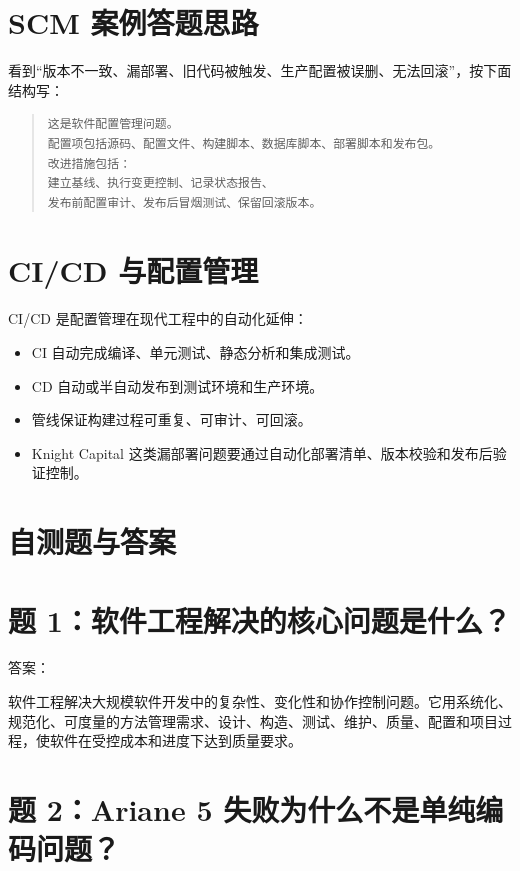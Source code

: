 \documentclass[UTF8,zihao=-4]{ctexart}
\begin{document}
\section{SCM 案例答题思路}

看到“版本不一致、漏部署、旧代码被触发、生产配置被误删、无法回滚”，按下面结构写：

\begin{quote}
\footnotesize
\begin{verbatim}
这是软件配置管理问题。
配置项包括源码、配置文件、构建脚本、数据库脚本、部署脚本和发布包。
改进措施包括：
建立基线、执行变更控制、记录状态报告、
发布前配置审计、发布后冒烟测试、保留回滚版本。
\end{verbatim}
\end{quote}

\section{CI/CD 与配置管理}

CI/CD 是配置管理在现代工程中的自动化延伸：

\begin{itemize}
\item CI 自动完成编译、单元测试、静态分析和集成测试。
\item CD 自动或半自动发布到测试环境和生产环境。
\item 管线保证构建过程可重复、可审计、可回滚。
\item Knight Capital 这类漏部署问题要通过自动化部署清单、版本校验和发布后验证控制。
\end{itemize}

\section{自测题与答案}

\section{题 1：软件工程解决的核心问题是什么？}

答案：

软件工程解决大规模软件开发中的复杂性、变化性和协作控制问题。它用系统化、规范化、可度量的方法管理需求、设计、构造、测试、维护、质量、配置和项目过程，使软件在受控成本和进度下达到质量要求。

\section{题 2：Ariane 5 失败为什么不是单纯编码问题？}
\end{document}
